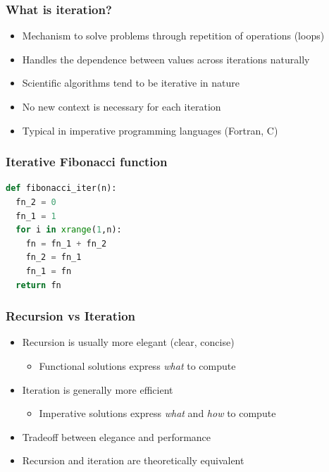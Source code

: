 \documentclass[xcolor=table,10pt,final]{beamer}
\begin{document}
\begin{frame}
	\frametitle{What is iteration?}
	\begin{itemize}
		\item Mechanism to solve problems through repetition of operations (loops)
		\item Handles the dependence between values across iterations naturally
		\item Scientific algorithms tend to be iterative in nature
		\item No new context is necessary for each iteration
		\item Typical in imperative programming languages (Fortran, C)
	\end{itemize}
\end{frame}

\begin{frame}[fragile]
	\frametitle{Iterative Fibonacci function}
	\begin{lstlisting}[language=Python]
def fibonacci_iter(n):
  fn_2 = 0
  fn_1 = 1
  for i in xrange(1,n):
    fn = fn_1 + fn_2
    fn_2 = fn_1
    fn_1 = fn
  return fn
	\end{lstlisting}
\end{frame}

\begin{frame}
	\frametitle{Recursion vs Iteration}
	\begin{itemize}
		\item Recursion is usually more elegant (clear, concise)
		\begin{itemize}
			\item Functional solutions express \emph{what} to compute
		\end{itemize}
		\item Iteration is generally more efficient
		\begin{itemize}
			\item Imperative solutions express \emph{what} and \emph{how} to compute
		\end{itemize}
		\item Tradeoff between elegance and performance
		\item Recursion and iteration are theoretically equivalent 
	\end{itemize}
\end{frame}
\end{document}
